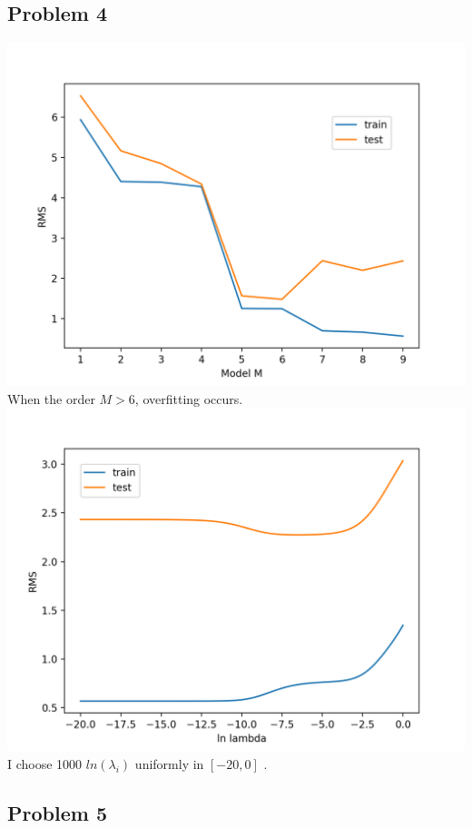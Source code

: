 \documentclass{article}
\begin{document}
\subsection*{Problem 4}
\includegraphics[width=\textwidth]{Figure_1.png}\\
When the order $M > 6 $, overfitting occurs.\\
\includegraphics[width=\textwidth]{Figure_2.png}\\
I choose 1000 $ln(\lambda_i)$ uniformly  in $\left[-20,0\right]$ .

\subsection*{Problem 5}
\end{document}
